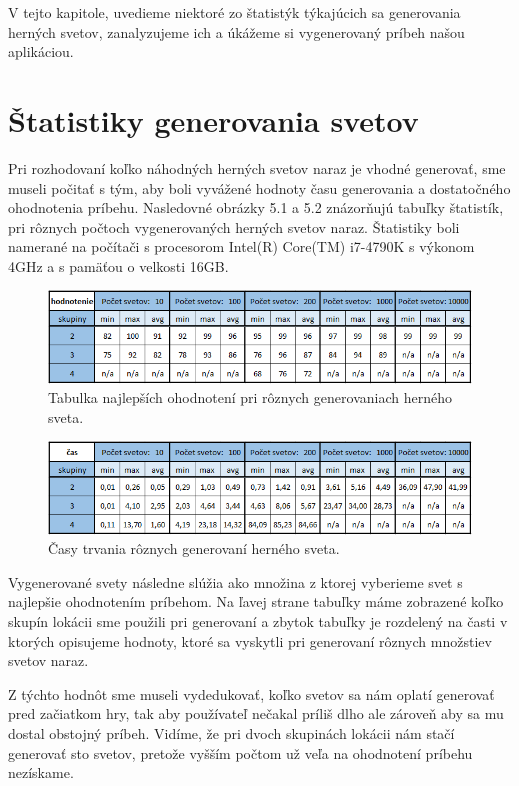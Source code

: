 V tejto kapitole, uvedieme niektoré zo štatistýk týkajúcich sa generovania herných svetov, zanalyzujeme ich a úkážeme si vygenerovaný príbeh našou aplikáciou.
\section{Štatistiky generovania svetov}
Pri rozhodovaní koľko náhodných herných svetov naraz je vhodné generovať, sme museli počitať s tým, aby boli vyvážené hodnoty času generovania a dostatočného ohodnotenia príbehu. Nasledovné obrázky 5.1 a 5.2 znázorňujú tabuľky štatistík, pri rôznych počtoch vygenerovaných herných svetov naraz. Štatistiky boli namerané na počítači s procesorom Intel(R) Core(TM) i7-4790K s výkonom 4GHz a s pamäťou o velkosti 16GB.
\begin{figure}[H] 
\includegraphics[scale=0.8]{img/ratingy.png}
\caption{Tabulka najlepších ohodnotení pri rôznych generovaniach herného sveta.}
\label{fig:ch51}
\end{figure}
\begin{figure}[H] 
\begin{center}
\includegraphics[scale=0.8]{img/casy.png}
\caption{Časy trvania rôznych generovaní herného sveta.}
\label{fig:ch52}
\end{center}
\end{figure}
Vygenerované svety následne slúžia ako množina z ktorej vyberieme svet s najlepšie ohodnotením príbehom. Na ľavej strane tabuľky máme zobrazené koľko skupín lokácii sme použili pri generovaní a zbytok tabuľky je rozdelený na časti v ktorých opisujeme hodnoty, ktoré sa vyskytli pri generovaní rôznych množstiev svetov naraz.\par
Z týchto hodnôt sme museli vydedukovať, koľko svetov sa nám oplatí generovať pred začiatkom hry, tak aby používateľ nečakal príliš dlho ale zároveň aby sa mu dostal obstojný príbeh. Vidíme, že pri dvoch skupinách lokácii nám stačí generovať sto svetov, pretože vyšším počtom už veľa na ohodnotení príbehu nezískame.\par
